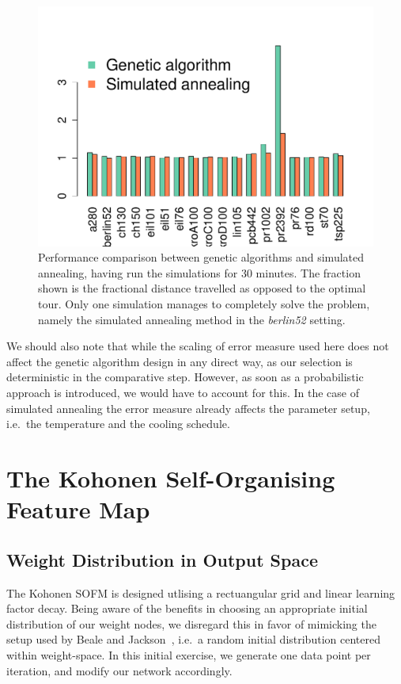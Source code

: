 \documentclass[10pt, twocolumn]{article}\usepackage[]{graphicx}\usepackage[]{color}
\makeatletter
\def\maxwidth{ %
  \ifdim\Gin@nat@width>\linewidth
    \linewidth
  \else
    \Gin@nat@width
  \fi
}
\theoremstyle{plain}
\newcommand{\ga}{genetic algorithm\xspace}
\newcommand{\kh}{SOFM\xspace}
\makeatother
\begin{document}
\begin{Schunk}
\begin{figure}[H]

{\centering \includegraphics[width=\maxwidth]{figure/twocolumn-comp-1} 

}

\caption[Performance comparison between genetic algorithms and simulated annealing, having run the simulations for 30 minutes]{Performance comparison between genetic algorithms and simulated annealing, having run the simulations for 30 minutes. The fraction shown is the fractional distance travelled as opposed to the optimal tour. Only one simulation manages to completely solve the problem, namely the simulated annealing method in the \textit{berlin52} setting.}\label{fig:comp}
\end{figure}
\end{Schunk}

We should also note that while the scaling of error measure used here does not affect the \ga design in any direct way, as our selection is deterministic in the comparative step. However, as soon as a probabilistic approach is introduced, we would have to account for this. In the case of simulated annealing the error measure already affects the parameter setup, i.e.\ the temperature and the cooling schedule.  


\section{The Kohonen Self-Organising Feature Map}
  \subsection{Weight Distribution in Output Space}
    The Kohonen \kh is designed utlising a rectuangular grid and linear learning factor decay. Being aware of the benefits in choosing an appropriate initial distribution of our weight nodes, we disregard this in favor of mimicking the setup used by Beale and Jackson~\cite{neuralnets}, i.e.\ a random initial distribution centered within weight-space. In this initial exercise, we generate one data point per iteration, and modify our network accordingly.
    
\end{document}

